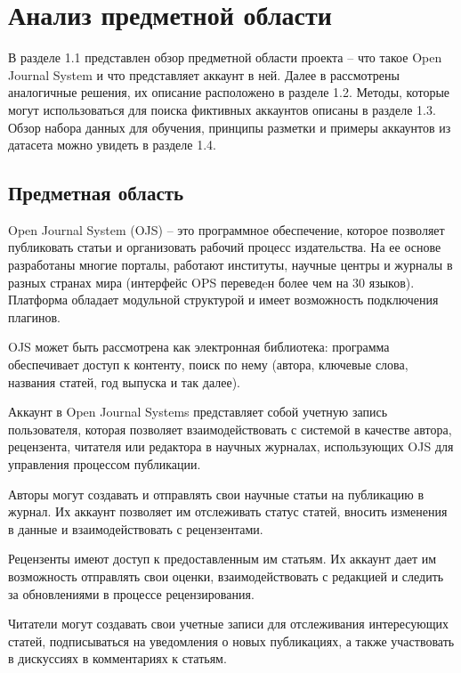 \newpage
\section{Анализ предметной области}
\label{sec:Background}

В разделе 1.1 представлен обзор предметной области проекта -- что такое Open Journal System и что представляет аккаунт в ней. Далее в рассмотрены аналогичные решения, их описание расположено в разделе 1.2. Методы, которые могут использоваться для поиска фиктивных аккаунтов описаны в разделе 1.3. Обзор набора данных для обучения, принципы разметки и примеры аккаунтов из датасета можно увидеть в разделе 1.4.

\vspace{1.5em}
\subsection{Предметная область}
\label{subsec:Variants}

Open Journal System (OJS) -- это программное обеспечение, которое позволяет публиковать статьи и организовать рабочий процесс издательства. На ее основе разработаны многие порталы, работают институты, научные центры и журналы в разных странах мира (интерфейс OPS переведeн более чем на 30 языков). Платформа обладает модульной структурой и имеет возможность подключения плагинов. 

OJS может быть рассмотрена как электронная библиотека: программа обеспечивает доступ к контенту, поиск по нему (автора, ключевые слова, названия статей, год выпуска и так далее). 

Аккаунт в Open Journal Systems представляет собой учетную запись пользователя, которая позволяет взаимодействовать с системой в качестве автора, рецензента, читателя или редактора в научных журналах, использующих OJS для управления процессом публикации.

Авторы могут создавать и отправлять свои научные статьи на публикацию в журнал. Их аккаунт позволяет им отслеживать статус статей, вносить изменения в данные и взаимодействовать с рецензентами.

Рецензенты имеют доступ к предоставленным им статьям. Их аккаунт дает им возможность отправлять свои оценки, взаимодействовать с редакцией и следить за обновлениями в процессе рецензирования.

Читатели могут создавать свои учетные записи для отслеживания интересующих статей, подписываться на уведомления о новых публикациях, а также участвовать в дискуссиях в комментариях к статьям.

